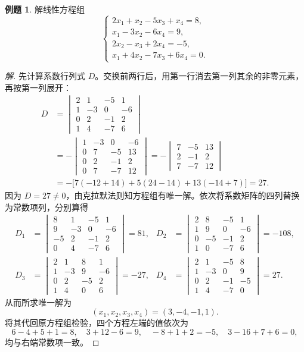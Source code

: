 \documentclass[UTF8, fontset=fandol, a4paper, 12pt]{ctexart}
\theoremstyle{definition}
\newtheorem{example}[definition]{例题}
\begin{document}
\begin{example}
解线性方程组
\[
 \begin{cases}
 2x_1+x_2-5x_3+x_4=8,\\
 x_1-3x_2-6x_4=9,\\
 2x_2-x_3+2x_4=-5,\\
 x_1+4x_2-7x_3+6x_4=0.
 \end{cases}
\]
\end{example}
\begin{proof}[解]
先计算系数行列式 $D$。交换前两行后，用第一行消去第一列其余的非零元素，再按第一列展开：
\begin{align*}
 D&=\begin{vmatrix}
 2&1&-5&1\\1&-3&0&-6\\0&2&-1&2\\1&4&-7&6
 \end{vmatrix}\\
 &=-\begin{vmatrix}
 1&-3&0&-6\\0&7&-5&13\\0&2&-1&2\\0&7&-7&12
 \end{vmatrix}
 =-\begin{vmatrix}7&-5&13\\2&-1&2\\7&-7&12\end{vmatrix}\\
 &=-\bigl[7(-12+14)+5(24-14)+13(-14+7)\bigr]=27.
\end{align*}
因为 $D=27\ne0$，由克拉默法则知方程组有唯一解。依次将系数矩阵的四列替换为常数项列，分别算得
\begin{align*}
 D_1&=\begin{vmatrix}8&1&-5&1\\9&-3&0&-6\\-5&2&-1&2\\0&4&-7&6\end{vmatrix}=81,
 &D_2&=\begin{vmatrix}2&8&-5&1\\1&9&0&-6\\0&-5&-1&2\\1&0&-7&6\end{vmatrix}=-108,\\
 D_3&=\begin{vmatrix}2&1&8&1\\1&-3&9&-6\\0&2&-5&2\\1&4&0&6\end{vmatrix}=-27,
 &D_4&=\begin{vmatrix}2&1&-5&8\\1&-3&0&9\\0&2&-1&-5\\1&4&-7&0\end{vmatrix}=27.
\end{align*}
从而所求唯一解为
\[
 \boxed{(x_1,x_2,x_3,x_4)=(3,-4,-1,1).}
\]
将其代回原方程组检验，四个方程左端的值依次为
\[
 6-4+5+1=8,\quad 3+12-6=9,\quad
 -8+1+2=-5,\quad 3-16+7+6=0,
\]
均与右端常数项一致。
\end{proof}
\end{document}

